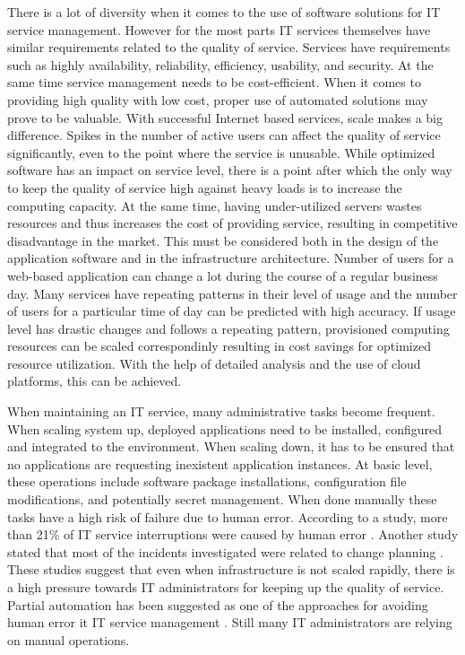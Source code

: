 There is a lot of diversity when it comes to the use of software solutions for
IT service management. However for the most parts IT services themselves have
similar requirements related to the quality of service. Services have
requirements such as highly availability, reliability, efficiency, usability,
and security. At the same time service management needs to be cost-efficient.
When it comes to providing high quality with low cost, proper use of automated
solutions may prove to be valuable. With successful Internet based services,
scale makes a big difference. Spikes in the number of active users can affect
the quality of service significantly, even to the point where the service is
unusable. While optimized software has an impact on service level, there is a
point after which the only way to keep the quality of service high against
heavy loads is to increase the computing capacity. At the same time, having
under-utilized servers wastes resources and thus increases the cost of
providing service, resulting in competitive disadvantage in the market. This
must be considered both in the design of the application software and in the
infrastructure architecture. Number of users for a web-based application can
change a lot during the course of a regular business day. Many services have
repeating patterns in their level of usage and the number of users for a
particular time of day can be predicted with high accuracy. If usage level has
drastic changes and follows a repeating pattern, provisioned computing
resources can be scaled correspondinly resulting in cost savings for optimized
resource utilization. With the help of detailed analysis and the use of cloud
platforms, this can be achieved.

When maintaining an IT service, many administrative tasks become frequent. When
scaling system up, deployed applications need to be installed, configured and
integrated to the environment. When scaling down, it has to be ensured that no
applications are requesting inexistent application instances. At basic level,
these operations include software package installations, configuration file
modifications, and potentially secret management. When done manually these
tasks have a high risk of failure due to human error. According to a study,
more than 21\% of IT service interruptions were caused by human error
\cite{shwartz2010quality}. Another study stated that most of the incidents
investigated were related to change planning \cite{saarelainen2015quality}.
These studies suggest that even when infrastructure is not scaled rapidly,
there is a high pressure towards IT administrators for keeping up the quality
of service. Partial automation has been suggested as one of the approaches for
avoiding human error it IT service management \cite{shwartz2010quality}. Still
many IT administrators are relying on manual operations.

